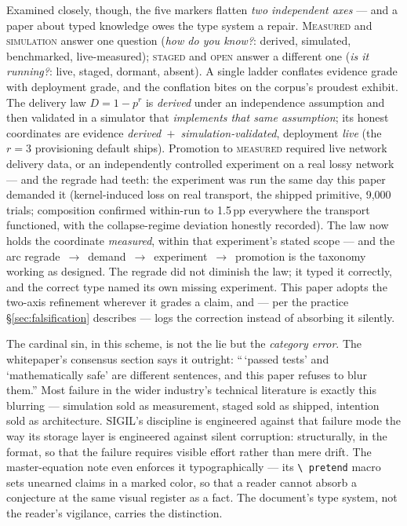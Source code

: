 \documentclass[10pt,a4paper]{article}
\begin{document}
Examined closely, though, the five markers flatten \emph{two independent axes} —
and a paper about typed knowledge owes the type system a repair. \textsc{Measured}
and \textsc{simulation} answer one question (\emph{how do you know?}: derived,
simulated, benchmarked, live-measured); \textsc{staged} and \textsc{open} answer a
different one (\emph{is it running?}: live, staged, dormant, absent). A single
ladder conflates evidence grade with deployment grade, and the conflation bites on
the corpus's proudest exhibit. The delivery law $D=1-p^r$ is \emph{derived} under
an independence assumption and then validated in a simulator that \emph{implements
that same assumption}; its honest coordinates are evidence
\emph{derived~$+$~simulation-validated}, deployment \emph{live} (the $r{=}3$
provisioning default ships). Promotion to \textsc{measured} required live network
delivery data, or an independently controlled experiment on a real lossy network —
and the regrade had teeth: the experiment was run the same day this paper demanded
it (kernel-induced loss on real transport, the shipped primitive, 9{,}000 trials;
composition confirmed within-run to 1.5\,pp everywhere the transport functioned,
with the collapse-regime deviation honestly recorded). The law now holds the
coordinate \emph{measured}, within that experiment's stated scope — and the arc
regrade~$\to$~demand~$\to$~experiment~$\to$~promotion is the taxonomy working as
designed. The regrade did not diminish the law; it typed it correctly, and the
correct type named its own missing experiment. This paper adopts the two-axis
refinement wherever it grades a claim, and — per the practice
\S\ref{sec:falsification} describes — logs the correction instead of absorbing it
silently.

The cardinal sin, in this scheme, is not the lie but the \emph{category error}. The
whitepaper's consensus section says it outright: ``\,`passed tests' and
`mathematically safe' are different sentences, and this paper refuses to blur
them.'' Most failure in the wider industry's technical literature is exactly this
blurring — simulation sold as measurement, staged sold as shipped, intention sold as
architecture. SIGIL's discipline is engineered against that failure mode the way its
storage layer is engineered against silent corruption: structurally, in the format,
so that the failure requires visible effort rather than mere drift. The
master-equation note even enforces it typographically — its \texttt{\textbackslash
pretend} macro sets unearned claims in a marked color, so that a reader cannot
absorb a conjecture at the same visual register as a fact. The document's type
system, not the reader's vigilance, carries the distinction.
\end{document}
